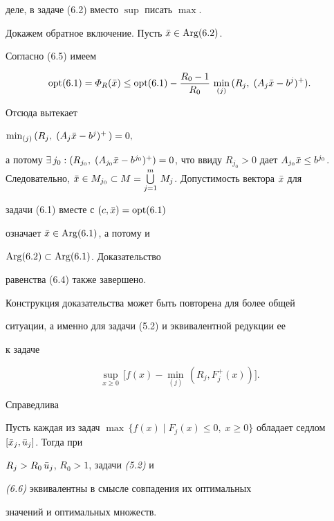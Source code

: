 \begin{pf}
деле, в задаче (6.2) вместо $\sup$ писать $\max$.


Докажем обратное включение. Пусть $\Bar{x} \in\operatorname{Arg}(6.2)$.


Согласно (6.5) имеем


$$


\opt(6.1) = \varPhi_R (\Bar{x}) \le


\opt(6.1) - \frac{R_0 - 1}{R_0}\,


\min_{(j)}\, (R_j,\; (A_j \Bar{x} - b^j)^+ ).


$$


Отсюда вытекает


$\min_{(j)}\,(R_j,\; (A_j \Bar{x} - b^j)^+ \,) = 0,$


а потому $\exists\, j_0: (R_{j_0},\; (A_{j_0} \Bar{x} -


b^{j_0})^+ ) = 0$, что ввиду $R_{j_0} > 0$ дает $A_{j_0}


\Bar{x} \le b^{j_0}$. Следовательно, $\Bar{x} \in M_{j_0} \su M


= \bigcup\limits_{j=1}^m\, M_j$. Допустимость вектора $\Bar{x}$ для


задачи (6.1) вместе с $(c, \Bar{x}) =\operatorname{opt}(6.1)$


означает $\Bar{x} \in\operatorname{Arg}(6.1)$, а потому и


$\operatorname{Arg}(6.2) \subset \operatorname{Arg}(6.1)$. Доказательство


равенства (6.4) также завершено.


\end{pf}





Конструкция доказательства может быть повторена для более общей


ситуации, а именно для задачи (5.2) и эквивалентной редукции ее


к задаче


\begin{equation}


\sup_{x \ge 0}\, \bigl[ f(x) - \min_{(j)}\, (R_j, F_j^+ (x)) \bigr].


\end{equation}


Справедлива





\begin{thms}


Пусть каждая из задач $\max\, \{ f(x) \mid F_j (x) \le 0,\; x


\ge 0 \}$ обладает седлом $[ \Bar{x}_j, \Bar{u}_j ]$. Тогда при


$R_j > R_0\,\Bar{u}_j$, $R_0 > 1$, задачи {\em (5.2)} и


{\em (6.6)} эквивалентны в смысле совпадения их оптимальных


значений и оптимальных множеств.


\end{thms}





